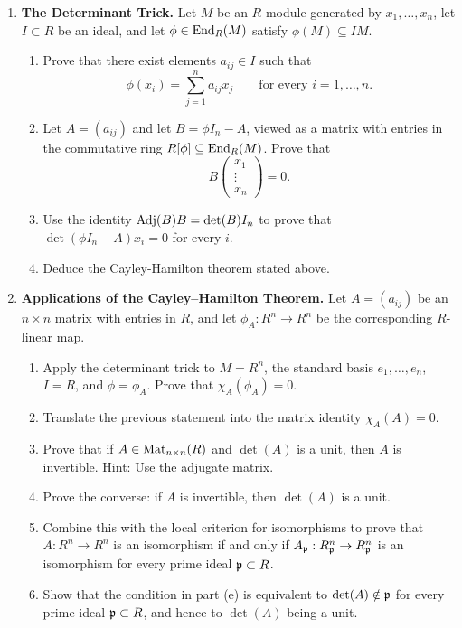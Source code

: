 \documentclass[Notebook.tex]{subfiles}
\begin{document}
\begin{enumerate}[leftmargin=*, resume=problems]
\item \textbf{The Determinant Trick.} Let $M$ be an $R$-module generated by $x_1,\ldots,x_n$, let $I\subset R$ be an ideal, and let $\phi\in \operatorname{End}_R(M)$ satisfy $\phi(M)\subseteq IM$.
\begin{enumerate}
    \item Prove that there exist elements $a_{ij}\in I$ such that
    \[
    \phi(x_i)=\sum_{j=1}^n a_{ij}x_j
    \qquad\text{for every }i=1,\ldots,n.
    \]
    \item Let $A=(a_{ij})$ and let $B=\phi I_n-A$, viewed as a matrix with entries in the commutative ring $R[\phi]\subseteq \operatorname{End}_R(M)$. Prove that
    \[
    B
    \begin{pmatrix}
    x_1\\ \vdots \\ x_n
    \end{pmatrix}=0.
    \]
    \item Use the identity $\operatorname{\text{Adj}}(B)B=\det(B)I_n$ to prove that $\det(\phi I_n-A)x_i=0$ for every $i$.
    \item Deduce the Cayley-Hamilton theorem stated above. 
    \end{enumerate}

\item \textbf{Applications of the Cayley--Hamilton Theorem.} Let $A=(a_{ij})$ be an $n\times n$ matrix with entries in $R$, and let $\phi_A:R^n\to R^n$ be the corresponding $R$-linear map.
\begin{enumerate}
    \item Apply the determinant trick to $M=R^n$, the standard basis $e_1,\ldots,e_n$, $I=R$, and $\phi=\phi_A$. Prove that $\chi_A(\phi_A)=0$.
    \item Translate the previous statement into the matrix identity $\chi_A(A)=0$.
    \item Prove that if $A\in \operatorname{Mat}_{n\times n}(R)$ and $\det(A)$ is a unit, then $A$ is invertible. Hint: Use the adjugate matrix.
    \item Prove the converse: if $A$ is invertible, then $\det(A)$ is a unit.
    \item Combine this with the local criterion for isomorphisms to prove that $A:R^n\to R^n$ is an isomorphism if and only if $A_{\operatorname{\mathfrak{p}}}:R_{\operatorname{\mathfrak{p}}}^n\to R_{\operatorname{\mathfrak{p}}}^n$ is an isomorphism for every prime ideal $\operatorname{\mathfrak{p}}\subset R$.
    \item Show that the condition in part (e) is equivalent to $\det(A)\notin \operatorname{\mathfrak{p}}$ for every prime ideal $\operatorname{\mathfrak{p}}\subset R$, and hence to $\det(A)$ being a unit.
\end{enumerate}


\end{enumerate}
\end{document}
